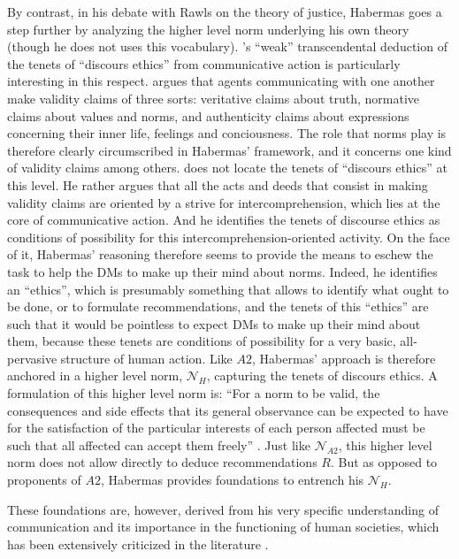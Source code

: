 \documentclass[preprint, french, english, 11pt, authoryear]{elsarticle}%
\begin{document}
By contrast, in his debate with Rawls on the theory of justice, Habermas goes a step further by analyzing the higher level norm underlying his own theory (though he does not uses this vocabulary). \cite{habermas_moralbewustsein_1983}'s “weak” transcendental deduction of the tenets of “discours ethics” from communicative action is particularly interesting in this respect. \citet{habermas_theorie_1981} argues that agents communicating with one another make validity claims of three sorts: veritative claims about truth, normative claims about values and norms, and authenticity claims about expressions concerning their inner life, feelings and conciousness. The role that norms play is therefore clearly circumscribed in Habermas' framework, and it concerns one kind of validity claims among others. \cite{habermas_moralbewustsein_1983} does not locate the tenets of “discours ethics” at this level. He rather argues that all the acts and deeds that consist in making validity claims are oriented by a strive for intercomprehension, which lies at the core of communicative action. And he identifies the tenets of discourse ethics as conditions of possibility for this intercomprehension-oriented activity. On the face of it, Habermas' reasoning therefore seems to provide the means to eschew the task to help the \acp{DM} to make up their mind about norms. Indeed, he identifies an “ethics”, which is presumably something that allows to identify what ought to be done, or to formulate recommendations, and the tenets of this “ethics” are such that it would be pointless to expect \acp{DM} to make up their mind about them, because these tenets are conditions of possibility for a very basic, all-pervasive structure of human action. Like $A2$, Habermas' approach is therefore anchored in a higher level norm, $\mathscr{N}_{H}$, capturing the tenets of discours ethics. A formulation of this higher level norm is: “For a norm to be valid, the consequences and side effects that its general observance can be expected to have for the satisfaction of the particular interests of each person affected must be such that all affected can accept them freely” \citep{habermas_moralbewustsein_1983}. Just like $\mathscr{N}_{A2}$, this higher level norm does not allow directly to deduce recommendations $R$. But as opposed to proponents of $A2$, Habermas provides foundations to entrench his $\mathscr{N}_{H}$. 

These foundations are, however, derived from his very specific understanding of communication and its importance in the functioning of human societies, which has been extensively criticized in the literature \citep{heath_communicative_2001,honneth_kritik_1985}. 
\end{document}
